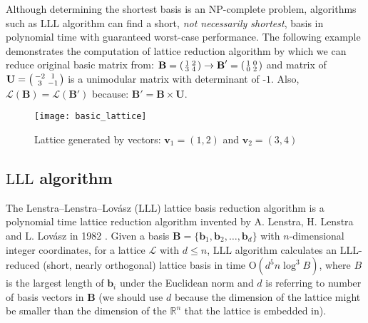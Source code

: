 Although determining the shortest basis is an NP-complete problem, algorithms such as $\mathrm{LLL}$ algorithm can find a short, \textit{not necessarily shortest}, basis in polynomial time with guaranteed worst-case performance. The following example demonstrates the computation of lattice reduction algorithm by which we can reduce original basic matrix from: $\textbf{B} = \begin{psmallmatrix}     1 & 2 \\     3 & 4 \\ \end{psmallmatrix} \to \textbf{B}' = \begin{psmallmatrix}    1 & 0 \\    0 & 2 \\ \end{psmallmatrix}
$ and matrix of $\textbf{U} = \begin{psmallmatrix}    -2 & 1 \\    3 & -1 \\ \end{psmallmatrix}
$ is a unimodular matrix with determinant of $\text{-1}$. Also, $\mathcal{L}(\textbf{B}) = \mathcal{L}(\textbf{B}')$ because: $\textbf{B}' = \textbf{B} \times \textbf{U}$. 
\begin{figure}[H]
\centering
\texttt{[image: basic\_lattice]}
\caption{Lattice generated by vectors: $\textbf{v}_1 = (1, 2)$ and $\textbf{v}_2 = (3, 4)$}
\end{figure}









\subsection{\texorpdfstring{$\mathrm{LLL}$}{LLL} algorithm}
The Lenstra–Lenstra–Lovász ($\mathrm{LLL}$) lattice basis reduction algorithm is a polynomial time lattice reduction algorithm invented by A. Lenstra, H. Lenstra and L. Lovász in 1982 \cite{Lenstra1982}. Given a basis ${\mathbf {B}}=\{{\mathbf  {b}}_{1},{\mathbf{b}}_{2},\dots ,{\mathbf{b}}_{d}\}$ with $n$-dimensional integer coordinates, for a lattice $\mathcal{L}$ with $d\leq n$, $\mathrm{LLL}$ algorithm calculates an $\mathrm{LLL}$-reduced (short, nearly orthogonal) lattice basis in time $\text{O}(d^{5}n\log ^{3}B)$, where $B$ is the largest length of $\textbf{b}_{i}$ under the Euclidean norm and $d$ is referring to number of basis vectors in $\textbf{B}$ (we should use $d$ because the dimension of the lattice might be smaller than the dimension of the $\mathbb{R}^n$ that the lattice is embedded in). 

